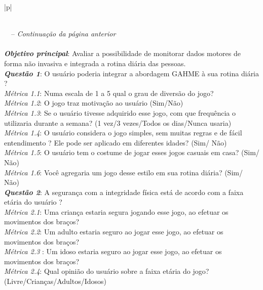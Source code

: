 \begin{longtable}{|p{\textwidth}|}
\caption{O Questionário GQM}\\
\hline
\endfirsthead
{}%
{\tablename\ \thetable\ -- \textit{Continuação da página anterior}} \\
\hline
\endhead
\hline {} \\
\endfoot
\hline
\endlastfoot
\textbf{\textit{Objetivo principal}}: Avaliar a possibilidade de monitorar dados motores de forma não invasiva e integrada a rotina diária das pessoas. \\ \hline
\textbf{\textit{Questão 1}}: O usuário poderia integrar a abordagem GAHME à sua rotina diária ?\\ \hline
\textit{Métrica 1.1}: Numa escala de 1 a 5 qual o grau de diversão do jogo? \\ \hline
\textit{Métrica 1.2}: O jogo traz motivação ao usuário (Sim/Não) \\ \hline
\textit{Métrica 1.3}: Se o usuário tivesse adquirido esse jogo, com que frequência o utilizaria durante a semana? (1 vez/3 vezes/Todos os dias/Nunca usaria) \\ \hline
\textit{Métrica 1.4}: O usuário considera o jogo simples, sem muitas regras e de fácil entendimento ? Ele pode ser aplicado em diferentes idades? (Sim/ Não) \\ \hline
\textit{Métrica 1.5}: O usuário tem o costume de jogar esses jogos casuais em casa? (Sim/ Não) \\ \hline
\textit{Métrica 1.6}: Você agregaria um jogo desse estilo em sua rotina diária? (Sim/ Não) \\ \hline
\textbf{\textit{Questão 2}}: A segurança com a integridade física está de acordo com a faixa etária do usuário ? \\ \hline
\textit{Métrica 2.1}: Uma criança estaria segura jogando esse jogo, ao efetuar os movimentos dos braços? \\ \hline
\textit{Métrica 2.2}: Um adulto estaria seguro ao jogar esse jogo, ao efetuar os movimentos dos braços? \\ \hline
\textit{Métrica 2.3	}: Um idoso estaria seguro ao jogar esse jogo, ao efetuar os movimentos dos braços? \\ \hline
\textit{Métrica 2.4}: Qual opinião do usuário sobre a faixa etária do jogo? (Livre/Crianças/Adultos/Idosos)
\label{tab:gqm}
\end{longtable}


